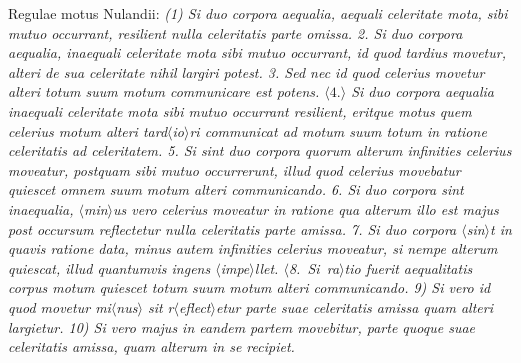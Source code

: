 \pend 
\pstart  
Regulae motus Nulandii\protect{}: \textit{(1) Si duo corpora aequalia, aequali celeritate mota, sibi mutuo occurrant, resilient nulla celeritatis parte omissa. 2. Si duo corpora aequalia, inaequali celeritate mota sibi mutuo occurrant, id quod tardius movetur, alteri de sua celeritate nihil largiri potest. 3. Sed nec id quod celerius movetur alteri totum suum motum communicare est potens. 
$\langle4.\rangle$ Si duo corpora aequalia inaequali celeritate mota sibi mutuo occurrant resilient, eritque motus quem celerius motum alteri tard$\langle$io$\rangle$ri communicat ad motum suum totum in ratione celeritatis ad celeritatem. 5. Si sint duo corpora } \textit{quorum alterum infinities celerius moveatur, postquam sibi mutuo occurrerunt, illud quod celerius movebatur quiescet omnem suum motum alteri communicando. 6. Si duo corpora sint inaequalia, $\langle$min$\rangle$us vero celerius moveatur in ratione qua alterum illo est majus post occursum reflectetur nulla celeritatis parte amissa. 7. Si duo corpora $\langle$sin$\rangle$t in quavis ratione data, minus autem infinities celerius moveatur, si nempe alterum quies\-cat, illud quantumvis ingens $\langle$impe$\rangle$llet. $\langle$8.~Si~ra$\rangle$tio fuerit aequalitatis corpus motum quiescet totum suum motum alteri communicando. 9) Si vero id quod movetur mi$\langle$nus$\rangle$ sit r$\langle$eflect$\rangle$etur parte suae celeritatis amissa quam alteri largietur. 10) Si vero majus in eandem partem movebitur, parte quoque suae celeritatis amissa, quam alterum in se recipiet.}
\pend
\count{}
\count{}
\count{}